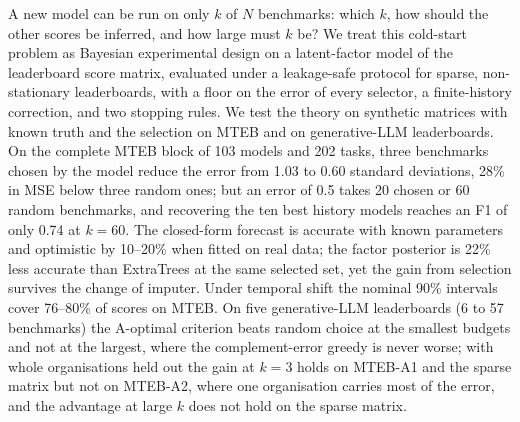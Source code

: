 A new model can be run on only $k$ of $N$ benchmarks: which $k$, how should the other scores be inferred, and how large must $k$ be?
We treat this cold-start problem as Bayesian experimental design on a latent-factor model of the leaderboard score matrix, evaluated under a leakage-safe protocol for sparse, non-stationary leaderboards, with a floor on the error of every selector, a finite-history correction, and two stopping rules.
We test the theory on synthetic matrices with known truth and the selection on MTEB and on generative-LLM leaderboards.
On the complete MTEB block of 103 models and 202 tasks, three benchmarks chosen by the model reduce the error from 1.03 to 0.60 standard deviations, 28\% in MSE below three random ones; but an error of 0.5 takes 20 chosen or 60 random benchmarks, and recovering the ten best history models reaches an F1 of only 0.74 at $k=60$.
The closed-form forecast is accurate with known parameters and optimistic by 10--20\% when fitted on real data; the factor posterior is 22\% less accurate than ExtraTrees at the same selected set, yet the gain from selection survives the change of imputer.
Under temporal shift the nominal 90\% intervals cover 76--80\% of scores on MTEB.
On five generative-LLM leaderboards (6 to 57 benchmarks) the A-optimal criterion beats random choice at the smallest budgets and not at the largest, where the complement-error greedy is never worse; with whole organisations held out the gain at $k=3$ holds on MTEB-A1 and the sparse matrix but not on MTEB-A2, where one organisation carries most of the error, and the advantage at large $k$ does not hold on the sparse matrix.
